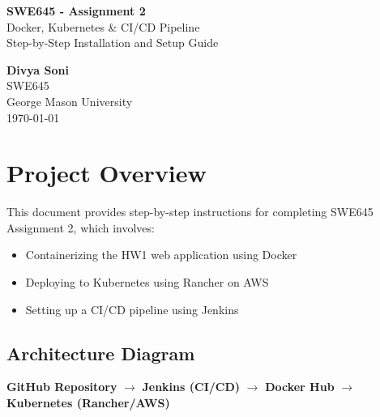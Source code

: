 \documentclass[12pt,a4paper]{article}
\begin{document}
\begin{titlepage}
    \centering
    \vspace*{2cm}
    {\Huge\bfseries SWE645 - Assignment 2\\[0.5cm]}
    {\Large Docker, Kubernetes \& CI/CD Pipeline\\[1cm]}
    {\large Step-by-Step Installation and Setup Guide\\[2cm]}
    
    \vfill
    
    {\Large\bfseries Divya Soni}\\[0.5cm]
    {\large SWE645}\\[0.5cm]
    {\large George Mason University}\\[1cm]
    {\large \today}
    
    \vfill
\end{titlepage}

\tableofcontents
\newpage

\section{Project Overview}

This document provides step-by-step instructions for completing SWE645 Assignment 2, which involves:

\begin{itemize}
    \item Containerizing the HW1 web application using Docker
    \item Deploying to Kubernetes using Rancher on AWS
    \item Setting up a CI/CD pipeline using Jenkins
\end{itemize}

\subsection{Architecture Diagram}

\begin{center}
\begin{tcolorbox}[width=0.9\textwidth, colback=gray!10, colframe=gray!50]
\centering
\textbf{GitHub Repository} $\rightarrow$ \textbf{Jenkins (CI/CD)} $\rightarrow$ \textbf{Docker Hub} $\rightarrow$ \textbf{Kubernetes (Rancher/AWS)}
\end{tcolorbox}
\end{center}
\end{document}
